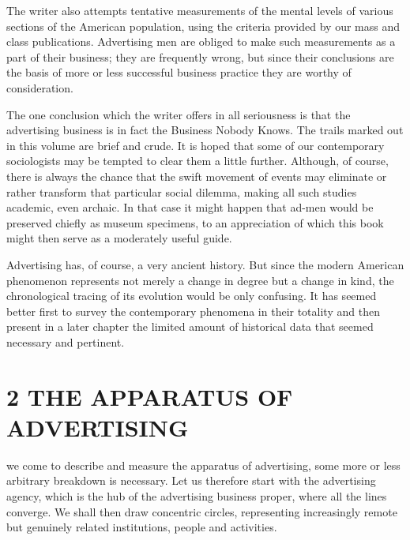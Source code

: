 \documentclass[openany,nobib]{tufte-book}
\let\oldchapter\chapter
\def\chapter{%
  \setcounter{footnote}{0}%
  \oldchapter
}
\begin{document}
The writer also attempts tentative measurements of the mental levels of
various sections of the American population, using the criteria provided
by our mass and class publications. Advertising men are obliged to make
such measurements as a part of their business; they are frequently
wrong, but since their conclusions are the basis of more or less
successful business practice they are worthy of consideration.

The one conclusion which the writer offers in all seriousness is that
the advertising business is in fact the Business Nobody Knows. The
trails marked out in this volume are brief and crude. It is hoped that
some of our contemporary sociologists may be tempted to clear them a
little further. Although, of course, there is always the chance that the
swift movement of events may eliminate or rather transform that
particular social dilemma, making all such studies academic, even
archaic. In that case it might happen that ad-men would be preserved
chiefly as museum specimens, to an appreciation of which this book might
then serve as a moderately useful guide.

Advertising has, of course, a very ancient history. But since the modern
American phenomenon represents not merely a change in degree but a
change in kind, the chronological tracing of its evolution would be only
confusing. It has seemed better first to survey the contemporary
phenomena in their totality and then present in a later chapter the
limited amount of historical data that seemed necessary and pertinent.\\



\chapter[2 \hspace*{1mm} THE APPARATUS OF ADVERTISING]{2 THE APPARATUS OF ADVERTISING}

 we come to describe and measure the apparatus of advertising, some
more or less arbitrary breakdown is necessary. Let us therefore start
with the advertising agency, which is the hub of the advertising
business proper, where all the lines converge. We shall then draw
concentric circles, representing increasingly remote but genuinely
related institutions, people and activities.
\end{document}
